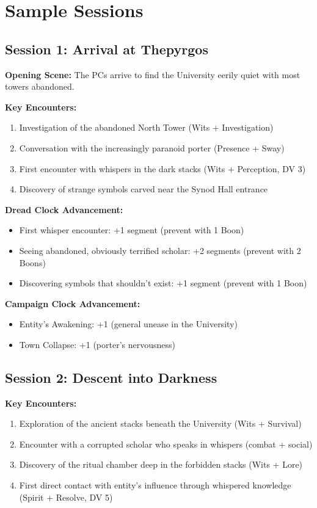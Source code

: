 \documentclass[11pt]{article}
\begin{document}
\section{Sample Sessions}

\subsection{Session 1: Arrival at Thepyrgos}

\textbf{Opening Scene:} The PCs arrive to find the University eerily quiet with most towers abandoned.

\textbf{Key Encounters:}
\begin{enumerate}
\item Investigation of the abandoned North Tower (Wits + Investigation)
\item Conversation with the increasingly paranoid porter (Presence + Sway)
\item First encounter with whispers in the dark stacks (Wits + Perception, DV 3)
\item Discovery of strange symbols carved near the Synod Hall entrance
\end{enumerate}

\textbf{Dread Clock Advancement:}
\begin{itemize}
\item First whisper encounter: +1 segment (prevent with 1 Boon)
\item Seeing abandoned, obviously terrified scholar: +2 segments (prevent with 2 Boons)
\item Discovering symbols that shouldn't exist: +1 segment (prevent with 1 Boon)
\end{itemize}

\textbf{Campaign Clock Advancement:}
\begin{itemize}
\item Entity's Awakening: +1 (general unease in the University)
\item Town Collapse: +1 (porter's nervousness)
\end{itemize}

\subsection{Session 2: Descent into Darkness}

\textbf{Key Encounters:}
\begin{enumerate}
\item Exploration of the ancient stacks beneath the University (Wits + Survival)
\item Encounter with a corrupted scholar who speaks in whispers (combat + social)
\item Discovery of the ritual chamber deep in the forbidden stacks (Wits + Lore)
\item First direct contact with entity's influence through whispered knowledge (Spirit + Resolve, DV 5)
\end{enumerate}
\end{document}
